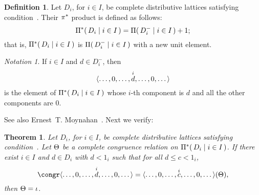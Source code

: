 \documentclass{amsart}
\theoremstyle{plain}
\newtheorem{theorem}{Theorem}
\theoremstyle{definition}
\newtheorem{definition}{Definition}
\theoremstyle{remark}
\newtheorem*{notation}{Notation}
\numberwithin{equation}{section}
\newcommand{\Prodm}[2]{\gP(\,#1\mid#2\,)}
\newcommand{\Prodsm}[2]{\gP^{*}(\,#1\mid#2\,)}
\newcommand{\vectsup}[2]{\vect<\dots,0,\dots,\overset{#1}{#2},%
\dots,0,\dots>}%
\begin{document}
\begin{definition}\label{D:P*} 
   Let $D_{i}$, for $i \in I$, be complete distributive 
   lattices satisfying condition~. Their $\gp^{*}$
   product is defined as follows: 
   \[
     \Prodsm{ D_{i} }{i \in I} = \Prodm{ D_{i}^{-} }{i \in I}+1;
   \]
   that is, $\Prodsm{ D_{i} }{i \in I}$ is 
   $\Prodm{ D_{i}^{-} }{i \in I}$ with a new unit element. 
\end{definition}

\begin{notation}
   If $i \in I$ and $d \in D_{i}^{-}$, then
   \[
      \vectsup{i}{d}
   \]
   is the element of $\Prodsm{ D_{i} }{i \in I}$ whose 
   $i$-th component is $d$ and all the other
   components are $0$. 
\end{notation}

See also Ernest~T. Moynahan~\cite{eM57a}. Next we verify:

\begin{theorem}\label{T:P*}  
   Let $D_{i}$, for $i \in I$, be complete distributive 
   lattices satisfying condition~. Let $\gQ$ 
   be a complete congruence relation on  
   $\Prodsm{ D_{i} }{i \in I}$. If there exist  
   $i \in I$ and $d \in D_{i}$ with $d < 1_{i}$ such 
   that for all $d \leq c < 1_{i}$,
   \begin{equation}\label{E:cong1}
      \congr\vectsup{i}{d}=\vectsup{i}{c}(\gQ), 
   \end{equation}
   then $\gQ = \gi$.
\end{theorem}
\end{document}
